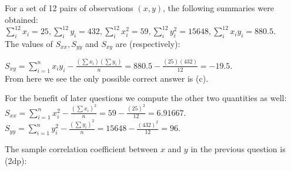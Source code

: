 \documentclass[bigtut]{tutorial}
\begin{document}
\begin{tutorial}
\begin{questions}
    

\question
For a set of 12 pairs of observations $(x,y)$, the following summaries were obtained:\\
$\sum_{i}^{12} x_{i} = 25,   \sum_{i}^{12} y_{i} = 432, \sum_{i}^{12} x_{i}^2 = 59, \sum_{i}^{12} y_{i}^2 = 15648, \sum_{i}^{12} x_{i} y_{i} = 880.5$. \\
The values of $S_{xx}, S_{yy}$ and $S_{xy}$ are (respectively):
    
 \begin{solution}
    $S_{xy} = \sum_{i=1}^n x_iy_i - \frac{(\sum x_i)(\sum y_i)}{n} = 880.5-\frac{(25)(432)}{12} = -19.5.$ \\
    From here we see the only possible correct answer is (c).
    
    \smallskip
    For the benefit of later questions we compute the other two quantities as well:\\
    $S_{xx} = \sum_{i=1}^n x_i^2 - \frac{(\sum x_i)^2}{n} = 59-\frac{(25)^2}{12} = 6.91667.$ \\
    $S_{yy} = \sum_{i=1}^n y_i^2 - \frac{(\sum y_i)^2}{n} = 15648-\frac{(432)^2}{12} = 96.$
    
    \end{solution}
    
    
 \question 
The sample correlation  coefficient between $x$ and $y$ in the previous question is (2dp):
    \begin{parts}[5]

\end{parts}
\end{questions}
\end{tutorial}
\end{document}
